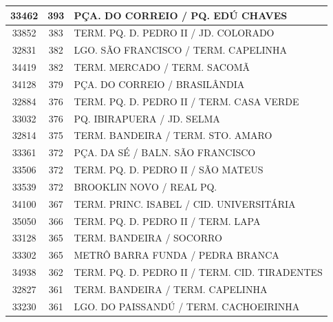 \documentclass[
	12pt,				%
	oneside,			%
	a4paper,			%
	english,			%
	brazil				%
	]{abntex2ppgsi}
\begin{document}
\begin{apendicesenv}
\begin{longtable}{c|c|p{7cm}}
    33462 & 393   & PÇA. DO CORREIO / PQ. EDÚ CHAVES \\
\hline

    33852 & 383   & TERM. PQ. D. PEDRO II / JD. COLORADO \\
\hline

    32831 & 382   & LGO. SÃO FRANCISCO / TERM. CAPELINHA \\
\hline

    34419 & 382   & TERM. MERCADO / TERM. SACOMÃ \\
\hline

    34128 & 379   & PÇA. DO CORREIO / BRASILÂNDIA \\
\hline

    32884 & 376   & TERM. PQ. D. PEDRO II / TERM. CASA VERDE \\
\hline

    33032 & 376   & PQ. IBIRAPUERA / JD. SELMA \\
\hline

    32814 & 375   & TERM. BANDEIRA / TERM. STO. AMARO \\
\hline

    33361 & 372   & PÇA. DA SÉ / BALN. SÃO FRANCISCO \\
\hline

    33506 & 372   & TERM. PQ. D. PEDRO II / SÃO MATEUS \\
\hline

    33539 & 372   & BROOKLIN NOVO / REAL PQ. \\
\hline

    34100 & 367   & TERM. PRINC. ISABEL / CID. UNIVERSITÁRIA \\
\hline

    35050 & 366   & TERM. PQ. D. PEDRO II / TERM. LAPA \\
\hline

    33128 & 365   & TERM. BANDEIRA / SOCORRO \\
\hline

    33302 & 365   & METRÔ BARRA FUNDA / PEDRA BRANCA \\
\hline

    34938 & 362   & TERM. PQ. D. PEDRO II / TERM. CID. TIRADENTES \\
\hline

    32827 & 361   & TERM. BANDEIRA / TERM. CAPELINHA \\
\hline

    33230 & 361   & LGO. DO PAISSANDÚ / TERM. CACHOEIRINHA \\
\hline


\end{longtable}
\end{apendicesenv}
\end{document}
